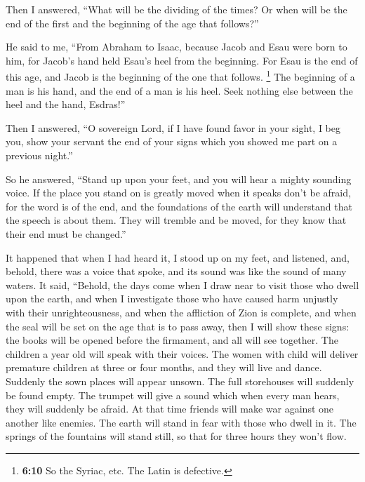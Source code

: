  Then I answered, ``What will be the dividing of the
times? Or when will be the end of the first and the beginning of the age
that follows?''

 He said to me, ``From Abraham to Isaac, because Jacob and
Esau were born to him, for Jacob's hand held Esau's heel from the
beginning.  For Esau is the end of this age, and Jacob is
the beginning of the one that follows.  \footnote{\textbf{6:10}
  So the Syriac, etc. The Latin is defective.} The beginning of a man is
his hand, and the end of a man is his heel. Seek nothing else between
the heel and the hand, Esdras!''

 Then I answered, ``O sovereign Lord, if I have found
favor in your sight,  I beg you, show your servant the
end of your signs which you showed me part on a previous night.''

 So he answered, ``Stand up upon your feet, and you will
hear a mighty sounding voice.  If the place you stand on
is greatly moved  when it speaks don't be afraid, for the
word is of the end, and the foundations of the earth will understand
 that the speech is about them. They will tremble and be
moved, for they know that their end must be changed.''

 It happened that when I had heard it, I stood up on my
feet, and listened, and, behold, there was a voice that spoke, and its
sound was like the sound of many waters.  It said,
``Behold, the days come when I draw near to visit those who dwell upon
the earth,  and when I investigate those who have caused
harm unjustly with their unrighteousness, and when the affliction of
Zion is complete,  and when the seal will be set on the
age that is to pass away, then I will show these signs: the books will
be opened before the firmament, and all will see together.
 The children a year old will speak with their voices.
The women with child will deliver premature children at three or four
months, and they will live and dance.  Suddenly the sown
places will appear unsown. The full storehouses will suddenly be found
empty.  The trumpet will give a sound which when every
man hears, they will suddenly be afraid.  At that time
friends will make war against one another like enemies. The earth will
stand in fear with those who dwell in it. The springs of the fountains
will stand still, so that for three hours they won't flow.

